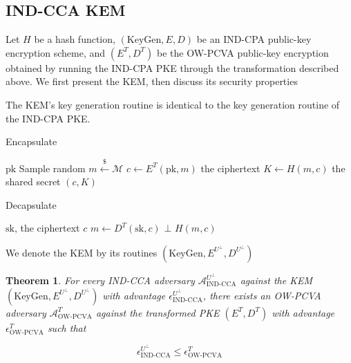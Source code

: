 \documentclass{article}
\newcommand{\leftsample}{\overset{{\scriptscriptstyle\$}}{\leftarrow}}
\newtheorem{theorem}{Theorem}[section]
\begin{document}
\subsection{IND-CCA KEM}
Let $H$ be a hash function, $(\text{KeyGen}, E, D)$ be an IND-CPA public-key encryption scheme, and $(E^T, D^T)$ be the OW-PCVA public-key encryption obtained by running the IND-CPA PKE through the transformation described above. We first present the KEM, then discuss its security properties

The KEM's key generation routine is identical to the key generation routine of the IND-CPA PKE.

\begin{algorithm}
    \caption{Encapsulate}
    \begin{algorithmic}[1]
        \Require $\text{pk}$
        \State Sample random $m \leftsample \mathcal{M}$
        \State $c \leftarrow E^T(\text{pk}, m)$ \Comment the ciphertext
        \State $K \leftarrow H(m, c)$ \Comment the shared secret
        \State \Return $(c, K)$
    \end{algorithmic}
\end{algorithm}

\begin{algorithm}
    \caption{Decapsulate}
    \begin{algorithmic}[1]
        \Require $\text{sk}$, the ciphertext $c$
        \State $m \leftarrow D^T(\text{sk}, c)$
            \State \Return $\bot$
        \EndIf
        \State \Return $H(m, c)$
    \end{algorithmic}
\end{algorithm}

We denote the KEM by its routines $(\text{KeyGen}, E^{U^\bot}, D^{U^\bot})$

\begin{theorem}\label{ind-cca-kem-adv}
    For every IND-CCA adversary $\mathcal{A}^{U^\bot}_\text{IND-CCA}$ against the KEM $(\text{KeyGen}, E^{U^\bot}, D^{U^\bot})$ with advantage $\epsilon^{U^\bot}_\text{IND-CCA}$, there exists an OW-PCVA adversary $\mathcal{A}^T_\text{OW-PCVA}$ against the transformed PKE $(E^T, D^T)$ with advantage $\epsilon^{T}_\text{OW-PCVA}$ such that

    \begin{equation}
        \epsilon^{U^\bot}_\text{IND-CCA} \leq \epsilon^{T}_\text{OW-PCVA}
    \end{equation}
\end{theorem}
\end{document}
